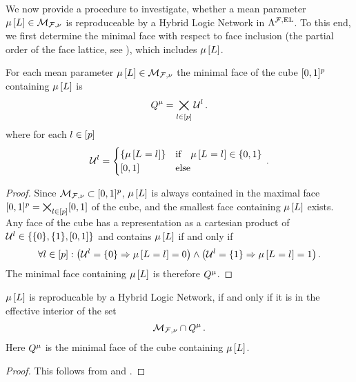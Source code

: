 We now provide a procedure to investigate, whether a mean parameter $\mu\left[L\right]\in\mathcal{M}_{\mathcal{F},\nu}$ is reproduceable by a Hybrid Logic Network in $\Lambda^{\mathcal{F},\mathrm{EL}}$.
To this end, we first determine the minimal face with respect to face inclusion (the partial order of the face lattice, see \cite{ziegler_lectures_2013}), which includes $\mu\left[L\right]$.

\begin{lemma}
    \label{lem:minimalContainingFace}
    For each mean parameter $\mu\left[L\right]\in\mathcal{M}_{\mathcal{F},\nu}$ the minimal face of the cube $[0,1]^{p}$ containing $\mu\left[L\right]$ is
    \begin{align*}
        Q^{\mu}
        = \bigtimes_{l\in[p]} \mathcal{U}^{l} \, .
    \end{align*}
    where for each $l\in[p]$
    \begin{align*}
        \mathcal{U}^{l} = \begin{cases}
                                   \{\mu\left[L_{}=l_{}\right]\} & \text{if} \quad \mu\left[L_{}=l_{}\right] \in \{0,1\} \\
                                   [0,1] & \text{else}
        \end{cases} \, .
    \end{align*}
\end{lemma}
\begin{proof}
    Since $\mathcal{M}_{\mathcal{F},\nu}\subset[0,1]^{p}$, $\mu\left[L\right]$ is always contained in the maximal face $[0,1]^{p}=\bigtimes_{l\in[p]}[0,1]$ of the cube, and the smallest face containing $\mu\left[L\right]$ exists.
    Any face of the cube has a representation as a cartesian product of $\mathcal{U}^{l}\in\{\{0\},\{1\},[0,1]\}$ and contains $\mu\left[L\right]$ if and only if
    \begin{align*}
        \forall{l\in[p]}:{\left(\mathcal{U}^{l}=\{0\} \Rightarrow \mu\left[L_{}=l_{}\right]=0 \right) \land \left(\mathcal{U}^{l}=\{1\} \Rightarrow \mu\left[L_{}=l_{}\right]=1 \right)} \, .
    \end{align*}
    The minimal face containing $\mu\left[L\right]$ is therefore $Q^{\mu}$.
\end{proof}

\begin{lemma}
    $\mu\left[L\right]$ is reproducable by a Hybrid Logic Network, if and only if it is in the effective interior of the set
    \begin{align*}
        \mathcal{M}_{\mathcal{F},\nu}\cap Q^{\mu} \, .
    \end{align*}
    Here $Q^{\mu}$ is the minimal face of the cube containing $\mu\left[L\right]$.
\end{lemma}
\begin{proof}
    This follows from  and .
\end{proof}

